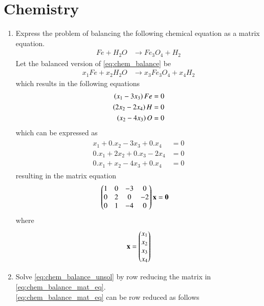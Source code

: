 \documentclass[journal,12pt,twocolumn]{IEEEtran}
\renewcommand\thesection{\arabic{section}}
\begin{document}
\section{Chemistry}
\begin{enumerate}[label=\arabic*.,ref=\thesection.\theenumi]
\item Express the problem of balancing the following chemical equation as a matrix equation.
%
\begin{align}
\label{eq:chem_balance}
Fe+H_2O &\rightarrow Fe_3O_4 + H_2
\end{align}
%
\solution Let the balanced version of \eqref{eq:chem_balance} be 
%
\begin{align}
\label{eq:chem_balance_unsol}
x_1Fe+x_2H_2 O &\rightarrow x_3Fe_3 O_4 + x_4H_2
\end{align}
%
which results in the following equations
%
\begin{align}
\begin{split}
\left(x_1 -3x_3\right)Fe &= 0
\\
\left(2x_2 -2x_4\right)H &= 0
\\
\left(x_2 -4x_3\right)O &= 0
\end{split}
\end{align}
which can be expressed as
\begin{align}
\begin{split}
x_1 + 0.x_2 -3x_3 +0.x_4&= 0
\\
0.x_1+2x_2 +0.x_3-2x_4 &= 0
\\
0.x_1+x_2 -4x_3+ 0.x_4 &= 0
\end{split}
\end{align}
%
resulting in the matrix equation
\begin{align}
\label{eq:chem_balance_mat_eq}
\begin{split}
\begin{pmatrix}
1 & 0 & -3 & 0
\\
0 & 2 & 0 & -2
\\
0 & 1 & -4 & 0
\end{pmatrix}
\mathbf{x} &= \mathbf{0}
\end{split}
\end{align}
%
where
\begin{align}
\mathbf{x} = \begin{pmatrix}x_1 \\ x_2 \\ x_3 \\ x_4\end{pmatrix} 
\end{align}
\item Solve \eqref{eq:chem_balance_unsol} by row reducing 
the matrix in \eqref{eq:chem_balance_mat_eq}.
\\
\solution  \eqref{eq:chem_balance_mat_eq} can be row reduced as follows

\end{enumerate}
\end{document}
